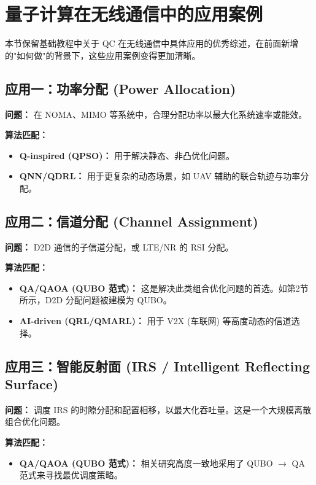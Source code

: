 \documentclass[11pt,a4paper]{article}
\begin{document}
\section{量子计算在无线通信中的应用案例}

本节保留基础教程中关于 QC 在无线通信中具体应用的优秀综述，在前面新增的"如何做"的背景下，这些应用案例变得更加清晰。

\subsection{应用一：功率分配 (Power Allocation)}

\textbf{问题：} 在 NOMA、MIMO 等系统中，合理分配功率以最大化系统速率或能效。

\textbf{算法匹配：}
\begin{itemize}
\item \textbf{Q-inspired (QPSO)：} 用于解决静态、非凸优化问题。
\item \textbf{QNN/QDRL：} 用于更复杂的动态场景，如 UAV 辅助的联合轨迹与功率分配。
\end{itemize}

\subsection{应用二：信道分配 (Channel Assignment)}

\textbf{问题：} D2D 通信的子信道分配，或 LTE/NR 的 RSI 分配。

\textbf{算法匹配：}
\begin{itemize}
\item \textbf{QA/QAOA (QUBO 范式)：} 这是解决此类组合优化问题的首选。如第2节所示，D2D 分配问题被建模为 QUBO。
\item \textbf{AI-driven (QRL/QMARL)：} 用于 V2X (车联网) 等高度动态的信道选择。
\end{itemize}

\subsection{应用三：智能反射面 (IRS / Intelligent Reflecting Surface)}

\textbf{问题：} 调度 IRS 的时隙分配和配置相移，以最大化吞吐量。这是一个大规模离散组合优化问题。

\textbf{算法匹配：}
\begin{itemize}
\item \textbf{QA/QAOA (QUBO 范式)：} 相关研究高度一致地采用了 QUBO $\rightarrow$ QA 范式来寻找最优调度策略。
\end{itemize}
\end{document}
